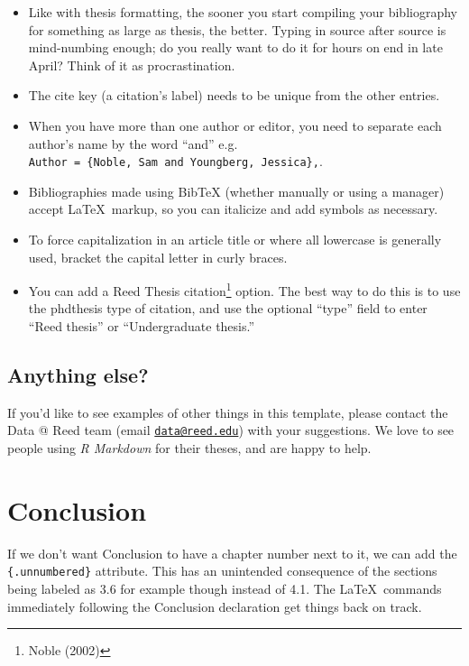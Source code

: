 \documentclass[12pt,twoside]{reedthesis}
\providecommand{\tightlist}{%
  \setlength{\itemsep}{0pt}\setlength{\parskip}{0pt}}
\begin{document}
  \begin{itemize}
  \tightlist
  \item
    Like with thesis formatting, the sooner you start compiling your
    bibliography for something as large as thesis, the better. Typing in
    source after source is mind-numbing enough; do you really want to do
    it for hours on end in late April? Think of it as procrastination.
  \item
    The cite key (a citation's label) needs to be unique from the other
    entries.
  \item
    When you have more than one author or editor, you need to separate
    each author's name by the word ``and'' e.g.
    \texttt{Author\ =\ \{Noble,\ Sam\ and\ Youngberg,\ Jessica\},}.
  \item
    Bibliographies made using BibTeX (whether manually or using a manager)
    accept \LaTeX~markup, so you can italicize and add symbols as
    necessary.
  \item
    To force capitalization in an article title or where all lowercase is
    generally used, bracket the capital letter in curly braces.
  \item
    You can add a Reed Thesis citation\footnote{Noble (2002)} option. The
    best way to do this is to use the phdthesis type of citation, and use
    the optional ``type'' field to enter ``Reed thesis'' or
    ``Undergraduate thesis.''
  \end{itemize}
  
  \section{Anything else?}\label{anything-else}
  
  If you'd like to see examples of other things in this template, please
  contact the Data @ Reed team (email
  \href{mailto:data@reed.edu}{\nolinkurl{data@reed.edu}}) with your
  suggestions. We love to see people using \emph{R Markdown} for their
  theses, and are happy to help.
  
  \chapter*{Conclusion}\label{conclusion}
  
  \setcounter{chapter}{4} \setcounter{section}{0}
  
  If we don't want Conclusion to have a chapter number next to it, we can
  add the \texttt{\{.unnumbered\}} attribute. This has an unintended
  consequence of the sections being labeled as 3.6 for example though
  instead of 4.1. The \LaTeX~commands immediately following the Conclusion
  declaration get things back on track.
  
\end{document}

